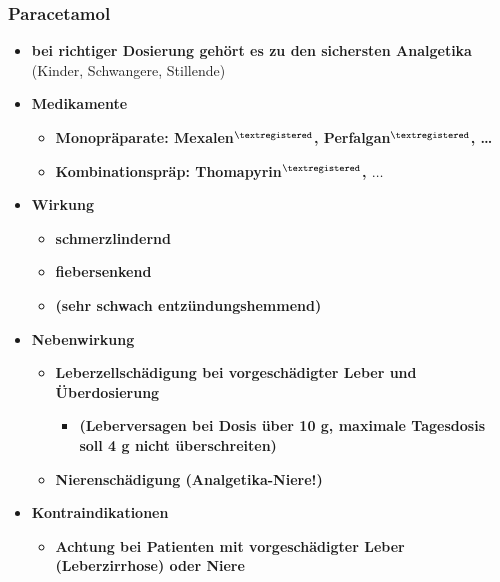 \subsubsection{Paracetamol}
	\begin{itemize}
		\item \textbf{bei richtiger Dosierung gehört es zu den sichersten Analgetika} (Kinder, Schwangere, Stillende)
		\item \textbf{Medikamente}
			\begin{itemize}
				\item \textbf{Monopräparate: Mexalen$^{\textregistered}$, Perfalgan$^{\textregistered}$, …}
				\item \textbf{Kombinationspräp: Thomapyrin$^{\textregistered}$, $\dots$}
			\end{itemize}
		\item \textbf{Wirkung}
			\begin{itemize}
				\item \textbf{schmerzlindernd}
				\item \textbf{fiebersenkend}
				\item \textbf{(sehr schwach entzündungshemmend)}
			\end{itemize}
		\item \textbf{Nebenwirkung}
			\begin{itemize}
				\item \textbf{Leberzellschädigung bei vorgeschädigter Leber und Überdosierung}
					\begin{itemize}
						\item \textbf{(Leberversagen bei Dosis über 10 g, maximale Tagesdosis soll 4 g nicht überschreiten)}
					\end{itemize}
				\item \textbf{Nierenschädigung (Analgetika-Niere!)}
			\end{itemize}
		\item \textbf{Kontraindikationen}
			\begin{itemize}
				\item \textbf{Achtung bei Patienten mit vorgeschädigter Leber (Leberzirrhose) oder Niere}
			\end{itemize}
	\end{itemize}
				
